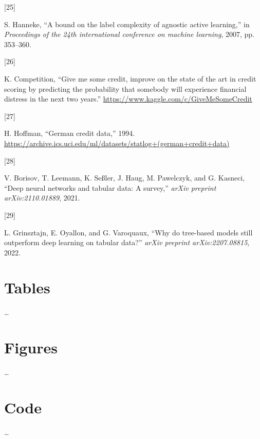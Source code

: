 \documentclass[
  conference]{IEEEtran}
\newlength{\cslhangindent}
\newlength{\csllabelwidth}
\newlength{\cslentryspacingunit} %
\newenvironment{CSLReferences}[2] %
 {%
  \setlength{\parindent}{0pt}
  \ifodd #1
  \let\oldpar\par
  \def\par{\hangindent=\cslhangindent\oldpar}
  \fi
  \setlength{\parskip}{#2\cslentryspacingunit}
 }%
 {}
\newcommand{\CSLLeftMargin}[1]{\parbox[t]{\csllabelwidth}{#1}}
\newcommand{\CSLRightInline}[1]{\parbox[t]{\linewidth - \csllabelwidth}{#1}\break}
\begin{document}
\begin{CSLReferences}{0}{0}
\leavevmode{}%
\CSLLeftMargin{{[}25{]} }%
\CSLRightInline{S. Hanneke, {``A bound on the label complexity of
agnostic active learning,''} in \emph{Proceedings of the 24th
international conference on machine learning}, 2007, pp. 353--360.}

\leavevmode{}%
\CSLLeftMargin{{[}26{]} }%
\CSLRightInline{K. Competition, {``Give me some credit, improve on the
state of the art in credit scoring by predicting the probability that
somebody will experience financial distress in the next two years.''}
\url{https://www.kaggle.com/c/GiveMeSomeCredit}}

\leavevmode{}%
\CSLLeftMargin{{[}27{]} }%
\CSLRightInline{H. Hoffman, {``German credit data,''} 1994.
\url{https://archive.ics.uci.edu/ml/datasets/statlog+(german+credit+data)}}

\leavevmode{}%
\CSLLeftMargin{{[}28{]} }%
\CSLRightInline{V. Borisov, T. Leemann, K. Seßler, J. Haug, M.
Pawelczyk, and G. Kasneci, {``Deep neural networks and tabular data: A
survey,''} \emph{arXiv preprint arXiv:2110.01889}, 2021.}

\leavevmode{}%
\CSLLeftMargin{{[}29{]} }%
\CSLRightInline{L. Grinsztajn, E. Oyallon, and G. Varoquaux, {``Why do
tree-based models still outperform deep learning on tabular data?''}
\emph{arXiv preprint arXiv:2207.08815}, 2022.}

\end{CSLReferences}

\pagebreak

\hypertarget{tables}{%
\section{Tables}\label{tables}}

\ldots{}

\pagebreak

\hypertarget{figures}{%
\section{Figures}\label{figures}}

\ldots{}

\pagebreak

\hypertarget{code}{%
\section{Code}\label{code}}

\ldots{}
\end{document}
